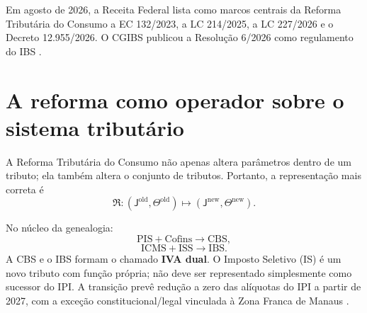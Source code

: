 \documentclass[11pt,a4paper]{article}
\newcommand{\CBS}{\mathrm{CBS}}
\newcommand{\IBS}{\mathrm{IBS}}
\newcommand{\ICMS}{\mathrm{ICMS}}
\newcommand{\ISS}{\mathrm{ISS}}
\newcommand{\PIS}{\mathrm{PIS}}
\newcommand{\COFINS}{\mathrm{Cofins}}
\begin{document}
\begin{center}
\end{center}

\begin{fonte}
Em agosto de 2026, a Receita Federal lista como marcos centrais da Reforma Tributária do Consumo a EC 132/2023, a LC 214/2025, a LC 227/2026 e o Decreto 12.955/2026. O CGIBS publicou a Resolução 6/2026 como regulamento do IBS \cite{RFBLeg,CGIBS6}.
\end{fonte}

\section{A reforma como operador sobre o sistema tributário}

A Reforma Tributária do Consumo não apenas altera parâmetros dentro de um tributo; ela também altera o conjunto de tributos. Portanto, a representação mais correta é
\begin{equation}
\boxed{
\mathfrak R:
(\mathsf J^{\mathrm{old}},\Theta^{\mathrm{old}})
\longmapsto
(\mathsf J^{\mathrm{new}},\Theta^{\mathrm{new}}).
}
\label{eq:reform-op}
\end{equation}

No núcleo da genealogia:
\begin{equation}
\boxed{\PIS+\COFINS\longrightarrow\CBS,}
\end{equation}
\begin{equation}
\boxed{\ICMS+\ISS\longrightarrow\IBS.}
\end{equation}
A CBS e o IBS formam o chamado \textbf{IVA dual}. O Imposto Seletivo (IS) é um novo tributo com função própria; não deve ser representado simplesmente como sucessor do IPI. A transição prevê redução a zero das alíquotas do IPI a partir de 2027, com a exceção constitucional/legal vinculada à Zona Franca de Manaus \cite{EC132,LC214,RFBEntenda}.
\end{document}
